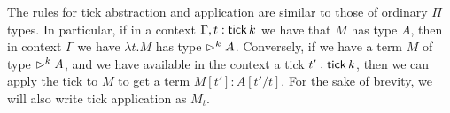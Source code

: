 
The rules for tick abstraction and application are similar to those of ordinary
$\Pi$ types. In particular, if in a context $\Gamma, t : \mathsf{tick}\, k$ we have that $M$
has type $A$, then in context $\Gamma$ we have $\lambda t.M$ has type $\vartriangleright^k
A$. %
%
Conversely, if we have a term $M$ of type $\vartriangleright^k A$, and we have available in
the context a tick $t' : \mathsf{tick}\, k$, then we can apply the tick to $M$ to get a
term $M[t'] : A[t'/t]$. %
%
For the sake of brevity, we will also write tick application as $M_t$.



